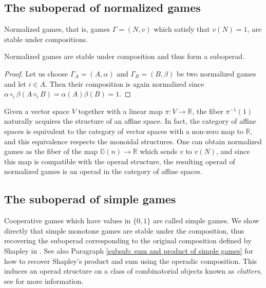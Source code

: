 \documentclass[a4paper,12pt]{amsart}
\begin{document}
\subsection{The suboperad of normalized games}
Normalized games, that is, games $\Gamma =(N,v)$ which satisfy that $v(N)= 1$, are stable under compositions. 

\begin{proposition}\label{prop: normalized games suboperads}
Normalized games are stable under composition and thus form a suboperad.
\end{proposition}

\begin{proof}
Let us choose \(\Gamma_A = (A, \alpha)\) and \(\Gamma_B = (B, \beta)\) be two normalized games and let \(i \in A\). Then their composition is again normalized since \(\alpha \circ_i \beta(A \diamond_i B) = \alpha(A)\beta(B) = 1\).
\end{proof}

\begin{remark}
Given a vector space $V$ together with a linear map $\pi: V \longrightarrow \mathbb{R}$, the fiber $\pi^{-1}(1)$ naturally acquires the structure of an affine space. In fact, the category of affine spaces is equivalent to the category of vector spaces with a non-zero map to $\mathbb{R}$, and this equivalence respects the monoidal structures. One can obtain normalized games as the fiber of the map $\mathbb{G}(n) \longrightarrow \mathbb{R}$ which sends $v$ to $v(N)$, and since this map is compatible with the operad structure, the resulting operad of normalized games is an operad in the category of affine spaces. 
\end{remark}

\subsection{The suboperad of simple games}
Cooperative games which have values in $\{0,1\}$ are called simple games. We show directly that simple monotone games are stable under the composition, thus recovering the suboperad corresponding to the original composition defined by Shapley in \cite{ShapleyComposition}. See also Paragraph \ref{subsub: sum and product of simple games} for how to recover Shapley's product and sum using the operadic composition. This induces an operad structure on a class of combinatorial objects known as \textit{clutters}, see \cite{billera1971composition} for more information.  
\end{document}
